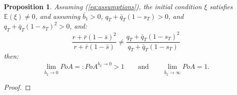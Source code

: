 \documentclass[11pt]{article}
\newtheorem{proposition}{Proposition}
\begin{document}
\begin{proposition}
	Assuming (\ref{eq:assumptions}), the initial condition $\xi$ satisfies $\mathbb{E}(\xi)\neq 0$, and assuming $\bar{b}_1> 0$, $q_T+\bar{q}_T(1-s_T)>0$, and $q_T+\bar{q}_T(1-s_T)^2>0$, and:
	\begin{equation*}
		\frac{r + \bar{r}(1- \bar{s})^2}{r + \bar{r}(1-\bar{s})} \neq \frac{q_T+\bar{q}_T(1-s_T)^2}{q_T+\bar{q}_T(1-s_T)}
	\end{equation*}
	then:
	\begin{equation*}
	\lim_{\bar{b}_2 \to 0} PoA =: PoA^{\bar{b}_2\to 0} > 1\qquad \text{and} \qquad\lim_{\bar{b}_2 \to \infty} PoA = 1.
	\end{equation*}
	\label{prop:b2bar}
\end{proposition}
\begin{proof}
	

\end{proof}
\end{document}
